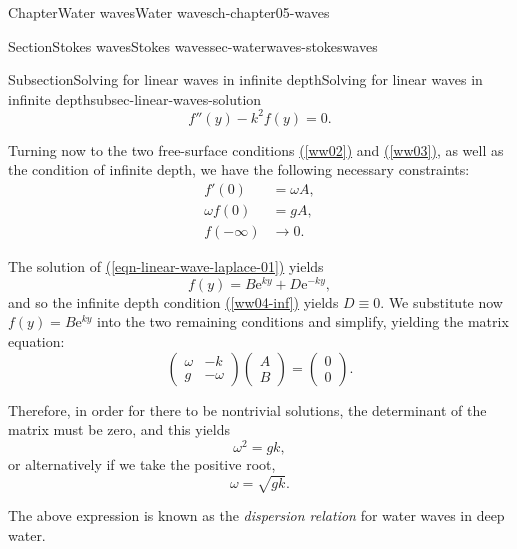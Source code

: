 \documentclass[oneside,10pt,]{book}
\newcommand{\xreffont}{\relax}
\numberwithin{equation}{section}
\newcommand{\e}{\mathrm{e}}
\newcommand{\amp}{&}
\begin{document}
\begin{chapterptx}{Chapter}{Water waves}{}{Water waves}{}{}{ch-chapter05-waves}
\begin{sectionptx}{Section}{Stokes waves}{}{Stokes waves}{}{}{sec-waterwaves-stokeswaves}
\begin{subsectionptx}{Subsection}{Solving for linear waves in infinite depth}{}{Solving for linear waves in infinite depth}{}{}{subsec-linear-waves-solution}
\begin{equation}
f''(y) - k^2 f(y) = 0.\label{eqn-linear-wave-laplace-01}
\end{equation}
%
\par
Turning now to the two free-surface conditions \hyperref[ww02]{({\xreffont\ref{ww02}})} and \hyperref[ww03]{({\xreffont\ref{ww03}})}, as well as the condition of infinite depth, we have the following necessary constraints:%
\begin{align}
f'(0) \amp= \omega A, \label{subsec-linear-waves-solution-5-3-1}\\
\omega f(0) \amp= gA, \label{subsec-linear-waves-solution-5-3-2}\\
f(-\infty) \amp\to 0. \label{ww04-02}
\end{align}
%
\par
The solution of \hyperref[eqn-linear-wave-laplace-01]{({\xreffont\ref{eqn-linear-wave-laplace-01}})} yields%
\begin{equation*}
f(y) = B \e^{ky} + D \e^{-ky},
\end{equation*}
and so the infinite depth condition \hyperref[ww04-inf]{({\xreffont\ref{ww04-inf}})} yields \(D \equiv 0\). We substitute now \(f(y) = B \e^{ky}\) into the two remaining conditions and simplify, yielding the matrix equation:%
\begin{equation*}
\begin{pmatrix}
\omega \amp -k \\
g \amp -\omega
\end{pmatrix}
\begin{pmatrix}
A \\ B
\end{pmatrix}
= 
\begin{pmatrix}
0 \\ 0
\end{pmatrix}.
\end{equation*}
%
\par
Therefore, in order for there to be nontrivial solutions, the determinant of the matrix must be zero, and this yields%
\begin{equation*}
\omega^2 = gk,
\end{equation*}
or alternatively if we take the positive root,%
\begin{equation}
\omega = \sqrt{gk}.\label{eqn-dispersion-deep}
\end{equation}
%
\par
The above expression is known as the \emph{dispersion relation} for water waves in deep water.%

\end{subsectionptx}
\end{sectionptx}
\end{chapterptx}
\end{document}

